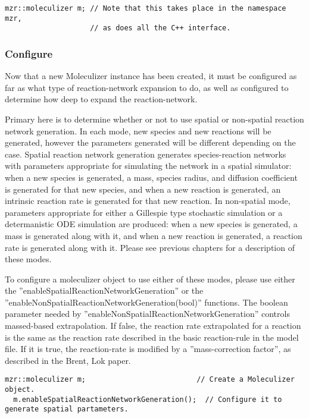 \lstset{language=C++}
\begin{lstlisting}[caption=Creating a moleculizer object, label=creatingmzrexample]
mzr::moleculizer m; // Note that this takes place in the namespace mzr,
                    // as does all the C++ interface.
\end{lstlisting}


\subsubsection{Configure}
Now that a new Moleculizer instance has been created, it must be
configured as far as what type of reaction-network expansion to do, as
well as configured to determine how deep to expand the
reaction-network.  

Primary here is to determine whether or not to use spatial or
non-spatial reaction network generation.  In each mode, new species
and new reactions will be generated, however the parameters generated
will be different depending on the case.  Spatial reaction network
generation generates species-reaction networks with parameters
appropriate for simulating the network in a spatial simulator: when a
new species is generated, a mass, species radius, and diffusion
coefficient is generated for that new species, and when a new reaction
is generated, an intrinsic reaction rate is generated for that new
reaction.  In non-spatial mode, parameters appropriate for either a
Gillespie type stochastic simulation or a determanistic ODE simulation
are produced: when a new species is generated, a mass is generated
along with it, and when a new reaction is generated, a reaction rate
is generated along with it.  Please see previous chapters for a
description of these modes.

To configure a moleculizer object to use either of these modes, please
use either the ''enableSpatialReactionNetworkGeneration'' or the
''enableNonSpatialReactionNetworkGeneration(bool)'' functions.  The
boolean parameter needed by
''enableNonSpatialReactionNetworkGeneration'' controls massed-based
extrapolation.  If false, the reaction rate extrapolated for a
reaction is the same as the reaction rate described in the basic
reaction-rule in the model file.  If it is true, the reaction-rate is
modified by a ''mass-correction factor'', as described in the Brent,
Lok paper.  

\lstset{language=C++}
\begin{lstlisting}[caption=Enabling spatial reaction generation]
  mzr::moleculizer m;                          // Create a Moleculizer object.
  m.enableSpatialReactionNetworkGeneration();  // Configure it to generate spatial partameters.
\end{lstlisting}

